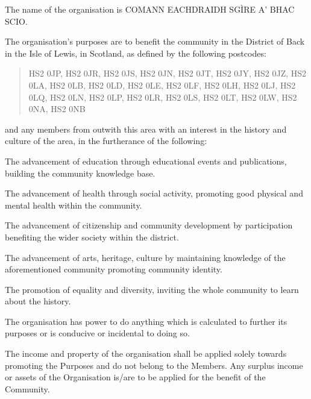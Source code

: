 ﻿\documentclass[a4paper,11pt,onecolumn ]{article}
\begin{document}
\begin{legal}
\item The name of the organisation is \newline COMANN EACHDRAIDH SGÌRE A’ BHAC SCIO.
\end{legal}



\begin{legal}
\item The organisation’s purposes are to benefit the community in the District of Back in the Isle of Lewis, in Scotland, as defined by the following postcodes: 

\begin{quote}
HS2 0JP, HS2 0JR, HS2 0JS, HS2 0JN, HS2 0JT, HS2 0JY, HS2 0JZ, HS2 0LA, HS2 0LB, HS2 0LD, HS2 0LE, HS2 0LF, HS2 0LH, HS2 0LJ, HS2 0LQ, HS2 0LN, HS2 0LP, HS2 0LR, HS2 0LS, HS2 0LT, HS2 0LW, HS2 0NA, HS2 0NB
\end{quote}

and any members from outwith this area with an interest in the history and culture of the area, in the furtherance of the following:
\begin{legal}
\item The advancement of education through educational events and publications, building the community knowledge base.
\item The advancement of health through social activity, promoting good physical and mental health within the community.
\item The advancement of citizenship and community development by participation benefiting the wider society within the district.
\item The advancement of arts, heritage, culture by maintaining knowledge of the aforementioned community promoting community identity.  
\item The promotion of equality and diversity, inviting the whole community to learn about the history.
\end{legal}

\end{legal}


\begin{legal}
\item The organisation has power to do anything which is calculated to further its purposes or is conducive or incidental to doing so.
\item The income and property of the organisation shall be applied solely towards promoting the Purposes and do not belong to the Members. Any surplus income or assets of the Organisation is/are to be applied for the benefit of the Community.
\end{legal}
\end{document}
